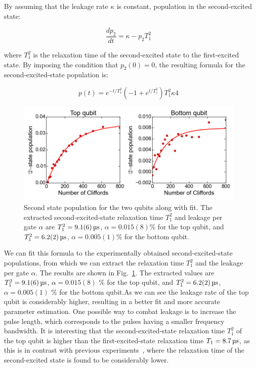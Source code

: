         By assuming that the leakage rate $\kappa$ is constant, population in the second-excited state:

        \begin{equation}
          \frac{d p_2}{d t}= \kappa - p_2 T_1^2
        \end{equation}

        where $T_1^2$ is the relaxation time of the second-excited state to the first-excited state. By imposing the condition that $p_2(0)=0$, the resulting formula for the second-excited-state population is:

        \begin{equation}
          p(t) = e^{-t/{T_1^2}}\left(  -1 + e^{t/{T_1^2}}\right)T_1^2 \kappa4
          \label{eq:2nd state formula}
        \end{equation}

        \begin{figure}[tb]
          \centering
          \includegraphics[width=\textwidth]{Figures/Randomized benchmarking/2nd-state leakage normal.png}
          \caption{Second state population for the two qubits along with fit. The extracted second-excited-state relaxation time $T_1^2$ and leakage per gate $\alpha$ are $T_1^2=\SIm{9.1(6)}{\micro \second}$, $\alpha=0.015(8)\%$ for the top qubit, and $T_1^2=\SIm{6.2(2)}{\micro \second}$, $\alpha=0.005(1)\%$ for the bottom qubit.}
          \label{fig:2nd-state leakage normal}
        \end{figure}


        We can fit this formula to the experimentally obtained second-excited-state populations, from which we can extract the relaxation time $T_1^2$ and the leakage per gate $\alpha$. The results are shown in Fig.~\ref{fig:2nd-state leakage normal}. The extracted values are $T_1^2=\SIm{9.1(6)}{\micro \second}$, $\alpha=0.015(8)$ \% for the top qubit, and $T_1^2=\SIm{6.2(2)}{\micro \second}$, $\alpha=0.005(1)$ \% for the bottom qubit.As we can see the leakage rate of the top qubit is considerably higher, resulting in a better fit and more accurate parameter estimation. One possible way to combat leakage is to increase the pulse length, which corresponds to the pulses having a smaller frequency bandwidth. It is interesting that the second-excited-state relaxation time $T_1^2$ of the top qubit is higher than the first-excited-state relaxation time $T_1=\SIm{8.7}{\micro \second}$, as this is in contrast with previous experiments~\cite{peterer2015coherence}, where the relaxation time of the second-excited state is found to be considerably lower.



